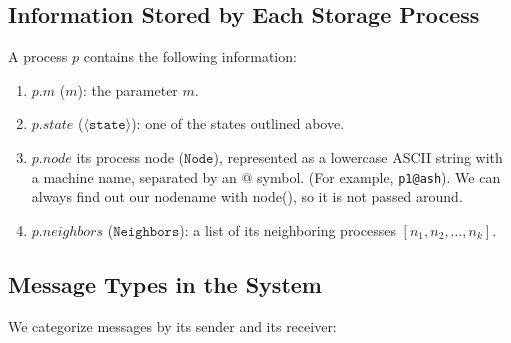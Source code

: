 \documentclass[11pt]{article}
\begin{document}
\subsection{Information Stored by Each Storage Process}
A process $p$ contains the following information:
\begin{enumerate}
\item $p.m$ ($m$): the parameter $m$.
\item $p.state$ ($\langle\texttt{state}\rangle$): one of the \numStates states outlined above.
\item $p.node$ its process node ($\texttt{Node}$), represented as a lowercase ASCII string with a machine name, separated by an @ symbol. (For example, \texttt{p1@ash}). We can always find out our nodename with node(), so it is not passed around.
\item $p.neighbors$ ($\texttt{Neighbors}$): a list of its neighboring processes $[n_1, n_2, \ldots, n_k]$.
\end{enumerate}

\subsection{Message Types in the System}
We categorize messages by its sender and its receiver:
\end{document}
